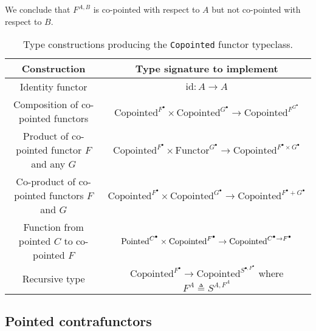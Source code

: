 We conclude that $F^{A,B}$ is co-pointed with respect to $A$ but
not co-pointed with respect to $B$.

\begin{table}
\begin{centering}
\begin{tabular}{|c|c|}
\hline 
\textbf{\footnotesize{}Construction} & \textbf{\footnotesize{}Type signature to implement}\tabularnewline
\hline 
\hline 
{\footnotesize{}Identity functor} & {\footnotesize{}$\text{id}:A\rightarrow A$}\tabularnewline
\hline 
{\footnotesize{}Composition of co-pointed functors} & {\footnotesize{}$\text{Copointed}^{F^{\bullet}}\times\text{Copointed}^{G^{\bullet}}\rightarrow\text{Copointed}^{F^{G^{\bullet}}}$}\tabularnewline
\hline 
{\footnotesize{}Product of co-pointed functor $F$ and any $G$} & {\footnotesize{}$\text{Copointed}^{F^{\bullet}}\times\text{Functor}^{G^{\bullet}}\rightarrow\text{Copointed}^{F^{\bullet}\times G^{\bullet}}$}\tabularnewline
\hline 
{\footnotesize{}Co-product of co-pointed functors $F$ and $G$} & {\footnotesize{}$\text{Copointed}^{F^{\bullet}}\times\text{Copointed}^{G^{\bullet}}\rightarrow\text{Copointed}^{F^{\bullet}+G^{\bullet}}$}\tabularnewline
\hline 
{\footnotesize{}Function from pointed $C$ to co-pointed $F$} & {\footnotesize{}$\text{\ensuremath{\text{Pointed}^{C^{\bullet}}}}\times\text{Copointed}^{F^{\bullet}}\rightarrow\text{Copointed}^{C^{\bullet}\rightarrow F^{\bullet}}$}\tabularnewline
\hline 
{\footnotesize{}Recursive type} & {\footnotesize{}$\text{Copointed}^{F^{\bullet}}\rightarrow\text{Copointed}^{S^{\bullet,F^{\bullet}}}$
where $F^{A}\triangleq S^{A,F^{A}}$}\tabularnewline
\hline 
\end{tabular}
\par\end{centering}
\caption{Type constructions producing the \lstinline!Copointed! functor typeclass.\label{tab:Type-constructions-for-copointed-functor}}
\end{table}


\subsection{Pointed contrafunctors\label{subsec:Pointed-contrafunctors}}

